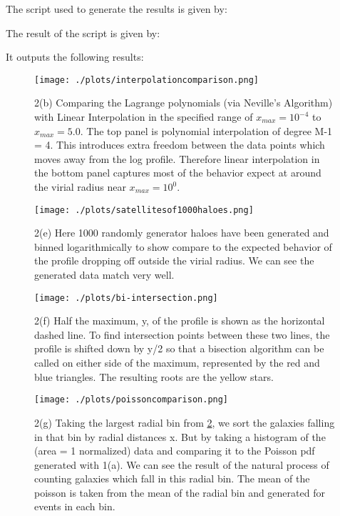 
The script used to generate the results is given by:



The result of the script is given by:

It outputs the following results:



\begin{figure}[h!]
  \centering
  \texttt{[image: ./plots/interpolationcomparison.png]}
  \caption{2(b) Comparing the Lagrange polynomials (via Neville's Algorithm) with Linear Interpolation in the specified range of $x_{max} = 10^{-4}$ to $x_{max} = 5.0$. The top panel is polynomial interpolation of degree M-1 = 4. This introduces extra freedom between the data points which moves away from the log profile. Therefore linear interpolation in the bottom panel captures most of the behavior expect at around the virial radius near $x_{max} = 10^{0}$. }
  \label{fig:interpcompare}
\end{figure}

\begin{figure}[h!]
  \centering
  \texttt{[image: ./plots/satellitesof1000haloes.png]}
  \caption{2(e) Here 1000 randomly generator haloes have been generated and binned logarithmically to show compare to the expected behavior of the profile dropping off outside the virial radius. We can see the generated data match very well.}
  \label{fig:1000haloes}
\end{figure}


\begin{figure}[h!]
  \centering
  \texttt{[image: ./plots/bi-intersection.png]}
  \caption{2(f) Half the maximum, y, of the profile is shown as the horizontal dashed line. To find intersection points between these two lines, the profile is shifted down by y/2 so that a bisection algorithm can be called on either side of the maximum, represented by the red and blue triangles. The resulting roots are the yellow stars.}
  \label{fig:intersection}
\end{figure}


\begin{figure}[h!]
  \centering
  \texttt{[image: ./plots/poissoncomparison.png]}
  \caption{2(g) Taking the largest radial bin from \ref{fig:1000haloes}, we sort the galaxies falling in that bin by radial distances x. But by taking a histogram of the (area = 1 normalized) data and comparing it to the Poisson pdf generated with 1(a). We can see the result of the natural process of counting galaxies which fall in this radial bin. The mean of the poisson is taken from the mean of the radial bin and generated for events in each bin.}
  \label{fig:comppoisson}
\end{figure}




